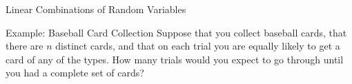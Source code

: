 \begin{frame}[allowframebreaks]{Linear Combinations of Random Variables}
% 

\begin{exampleblock}{Example: Baseball Card Collection}
  Suppose that you collect baseball cards, that there are $n$ distinct cards, and that on each trial you are equally likely to get a card of any of the types.
  How many trials would you expect to go through until you had a complete set of cards?
  

\end{exampleblock}
\end{frame}

